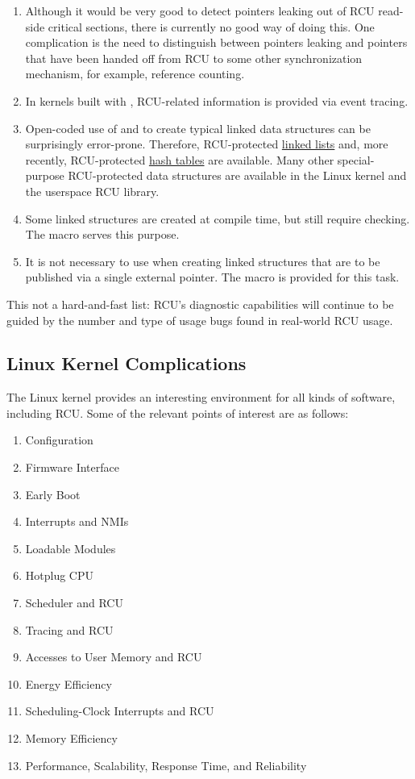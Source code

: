 \begin{enumerate}
\item Although it would be very good to detect pointers leaking out of RCU
   read-side critical sections, there is currently no good way of doing
   this.
   One complication is the need to distinguish between pointers
   leaking and pointers that have been handed off from RCU to some other
   synchronization mechanism, for example, reference counting.
\item In kernels built with , RCU-related information
   is provided via event tracing.
\item Open-coded use of  and 
   to create typical linked data structures can be surprisingly
   error-prone. Therefore, RCU-protected
   \href{https://lwn.net/Articles/609973/#RCU%20List%20APIs}{linked lists} and,
   more recently, RCU-protected
   \href{https://lwn.net/Articles/612100/}{hash tables} are available.
   Many
   other special-purpose RCU-protected data structures are available in
   the Linux kernel and the userspace RCU library.
\item Some linked structures are created at compile time, but still require
    checking.
   The  macro serves
   this purpose.
\item It is not necessary to use  when creating
   linked structures that are to be published via a single external
   pointer.
   The  macro is provided for this task.
\end{enumerate}

This not a hard-and-fast list:
RCU's diagnostic capabilities will
continue to be guided by the number and type of usage bugs found in
real-world RCU usage.


\subsection{Linux Kernel Complications}

The Linux kernel provides an interesting environment for all kinds of
software, including RCU\@.
Some of the relevant points of interest are as
follows:

\begin{enumerate}
\item Configuration
\item Firmware Interface
\item Early Boot
\item Interrupts and NMIs
\item Loadable Modules
\item Hotplug CPU
\item Scheduler and RCU
\item Tracing and RCU
\item Accesses to User Memory and RCU
\item Energy Efficiency
\item Scheduling-Clock Interrupts and RCU
\item Memory Efficiency
\item Performance, Scalability, Response Time, and Reliability
\end{enumerate}

